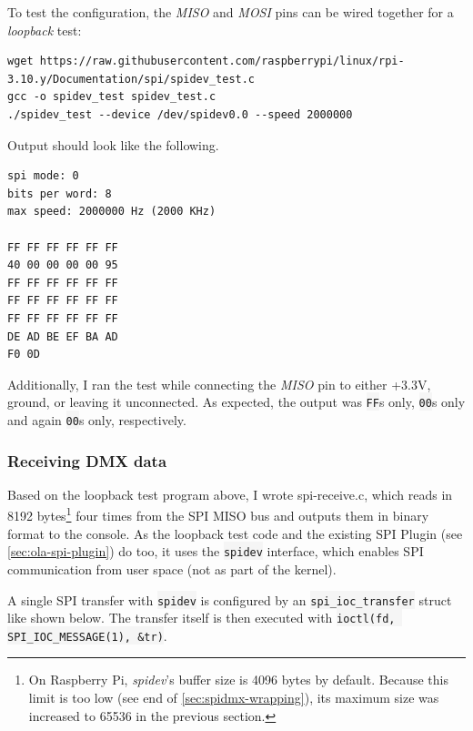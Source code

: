To test the configuration, the \emph{MISO} and \emph{MOSI} pins can be
wired together for a \emph{loopback} test:

\begin{lstlisting}[style=myBash, morekeywords={wget, gcc}]
wget https://raw.githubusercontent.com/raspberrypi/linux/rpi-3.10.y/Documentation/spi/spidev_test.c
gcc -o spidev_test spidev_test.c
./spidev_test --device /dev/spidev0.0 --speed 2000000
\end{lstlisting}

Output should look like the following.

\begin{lstlisting}
spi mode: 0
bits per word: 8
max speed: 2000000 Hz (2000 KHz)

FF FF FF FF FF FF
40 00 00 00 00 95
FF FF FF FF FF FF
FF FF FF FF FF FF
FF FF FF FF FF FF
DE AD BE EF BA AD
F0 0D
\end{lstlisting}

Additionally, I ran the test while connecting the \emph{MISO} pin to
either +3.3V, ground, or leaving it unconnected. As expected, the output
was \colorbox{WhiteSmoke}{\lstinline!FF!}s only, \colorbox{WhiteSmoke}{\lstinline!00!}s only and again \colorbox{WhiteSmoke}{\lstinline!00!}s
only, respectively.

\subsubsection{Receiving DMX data}\label{receiving-dmx-data}

Based on the loopback test program
above, I wrote \gls{spi-receive.c}, which reads in 8192 bytes\footnote{On
  Raspberry Pi, \emph{spidev}'s buffer size is 4096 bytes by default.
  Because this limit is too low (see end of \cref{sec:spidmx-wrapping}),
  its maximum size was increased to 65536 in the previous section.} four
times from the SPI MISO bus and outputs them in binary format to the
console. As the loopback test code and the existing SPI Plugin (see
\cref{sec:ola-spi-plugin}) do too, it uses the \colorbox{WhiteSmoke}{\lstinline!spidev!}
interface, which enables SPI communication from user space (not as part
of the kernel).

A single SPI transfer with \colorbox{WhiteSmoke}{\lstinline!spidev!} is configured by an
\colorbox{WhiteSmoke}{\lstinline!spi_ioc_transfer!} struct like shown below. The transfer
itself is then executed with
\colorbox{WhiteSmoke}{\lstinline!ioctl(fd, SPI_IOC_MESSAGE(1), &tr)!}.

